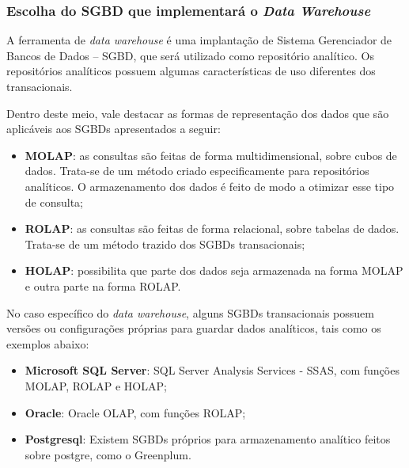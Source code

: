 \subsubsection{Escolha do SGBD que implementará o \emph{Data Warehouse}} \label{subsec:sgbd}

A ferramenta de \emph{data warehouse} é uma implantação de Sistema Gerenciador de Bancos de Dados -- SGBD, que será utilizado como repositório analítico. Os repositórios analíticos possuem algumas características de uso diferentes dos transacionais. 

Dentro deste meio, vale destacar as formas de representação dos dados que são aplicáveis aos SGBDs \cite{wikipedia:olap2} apresentados a seguir:
\begin{itemize}
    \item \textbf{MOLAP}: as consultas são feitas de forma multidimensional, sobre cubos de dados. Trata-se de um método criado especificamente para repositórios analíticos. O armazenamento dos dados é feito de modo a otimizar esse tipo de consulta;
    \item \textbf{ROLAP}: as consultas são feitas de forma relacional, sobre tabelas de dados. Trata-se de um método trazido dos SGBDs transacionais;
    \item \textbf{HOLAP}: possibilita que parte dos dados seja armazenada na forma MOLAP e outra parte na forma ROLAP.
\end{itemize}


No caso específico do \emph{data warehouse}, alguns SGBDs transacionais possuem versões ou configurações próprias para guardar dados analíticos, tais como os exemplos \cite{wikipedia:olap} abaixo:
\begin{itemize}
    \item \textbf{Microsoft SQL Server}: SQL Server Analysis Services - SSAS, com funções MOLAP, ROLAP e HOLAP;
    \item \textbf{Oracle}: Oracle OLAP, com funções ROLAP;
    \item \textbf{Postgresql}: Existem SGBDs próprios para armazenamento analítico feitos sobre postgre, como o Greenplum.
\end{itemize}

